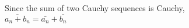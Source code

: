 \documentclass[preview]{standalone}
\begin{document}
\begin{center}
Since the sum of two Cauchy sequences is Cauchy,\\$\bar{a_n + b_n} = \bar{a_n} + \bar{b_n}$
\end{center}
\end{document}
